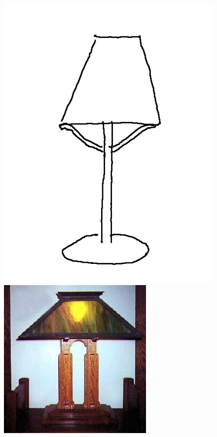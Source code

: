 \documentclass[conference]{IEEEtran}
\begin{document}
\begin{figure}[H]
\begin{multicols}{4}
    \centering
    \includegraphics[width=0.95\linewidth]{image/lamps.jpg} \par
    \includegraphics[width=0.95\linewidth]{image/lamp1.jpg} \par

\end{multicols}
\end{figure}
\end{document}
